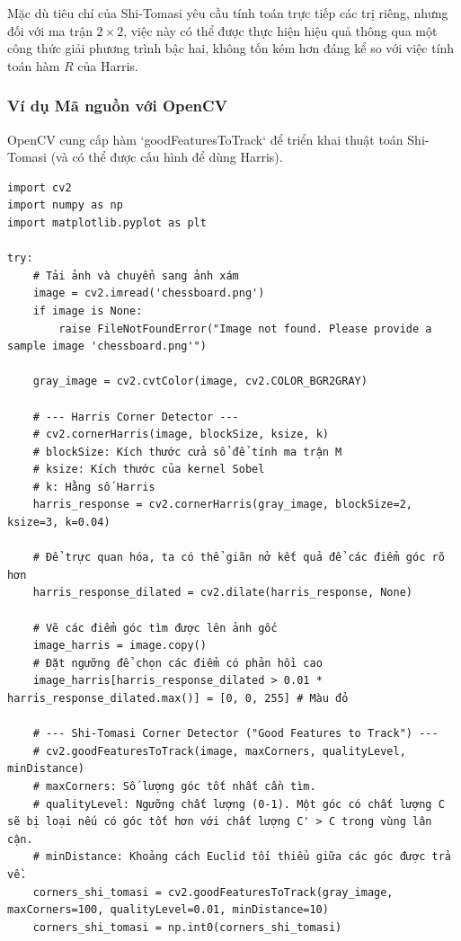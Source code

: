 Mặc dù tiêu chí của Shi-Tomasi yêu cầu tính toán trực tiếp các trị riêng, nhưng đối với ma trận $2 \times 2$, việc này có thể được thực hiện hiệu quả thông qua một công thức giải phương trình bậc hai, không tốn kém hơn đáng kể so với việc tính toán hàm $R$ của Harris.

\subsubsection{Ví dụ Mã nguồn với OpenCV}
\label{subsubsec:harris_shi_tomasi_code}
OpenCV cung cấp hàm `goodFeaturesToTrack` để triển khai thuật toán Shi-Tomasi (và có thể được cấu hình để dùng Harris).

\begin{verbatim}
import cv2
import numpy as np
import matplotlib.pyplot as plt

try:
    # Tải ảnh và chuyển sang ảnh xám
    image = cv2.imread('chessboard.png')
    if image is None:
        raise FileNotFoundError("Image not found. Please provide a sample image 'chessboard.png'")
        
    gray_image = cv2.cvtColor(image, cv2.COLOR_BGR2GRAY)
    
    # --- Harris Corner Detector ---
    # cv2.cornerHarris(image, blockSize, ksize, k)
    # blockSize: Kích thước cửa sổ để tính ma trận M
    # ksize: Kích thước của kernel Sobel
    # k: Hằng số Harris
    harris_response = cv2.cornerHarris(gray_image, blockSize=2, ksize=3, k=0.04)
    
    # Để trực quan hóa, ta có thể giãn nở kết quả để các điểm góc rõ hơn
    harris_response_dilated = cv2.dilate(harris_response, None)
    
    # Vẽ các điểm góc tìm được lên ảnh gốc
    image_harris = image.copy()
    # Đặt ngưỡng để chọn các điểm có phản hồi cao
    image_harris[harris_response_dilated > 0.01 * harris_response_dilated.max()] = [0, 0, 255] # Màu đỏ

    # --- Shi-Tomasi Corner Detector ("Good Features to Track") ---
    # cv2.goodFeaturesToTrack(image, maxCorners, qualityLevel, minDistance)
    # maxCorners: Số lượng góc tốt nhất cần tìm.
    # qualityLevel: Ngưỡng chất lượng (0-1). Một góc có chất lượng C sẽ bị loại nếu có góc tốt hơn với chất lượng C' > C trong vùng lân cận.
    # minDistance: Khoảng cách Euclid tối thiểu giữa các góc được trả về.
    corners_shi_tomasi = cv2.goodFeaturesToTrack(gray_image, maxCorners=100, qualityLevel=0.01, minDistance=10)
    corners_shi_tomasi = np.int0(corners_shi_tomasi)
    

\end{verbatim}
